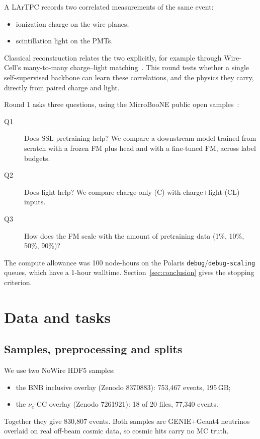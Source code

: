 \documentclass[11pt,a4paper]{article}
\newcommand{\nue}{\ensuremath{\nu_e}}
\newcommand{\code}[1]{\texttt{\small #1}}
\begin{document}
A LArTPC records two correlated measurements of the same event:
\begin{itemize}
  \item ionization charge on the wire planes;
  \item scintillation light on the PMTs.
\end{itemize}
Classical reconstruction relates the two explicitly, for example through Wire-Cell's many-to-many charge--light matching~\cite{wcqlmatch,wcgeneric}. This round tests whether a single self-supervised backbone can learn these correlations, and the physics they carry, directly from paired charge and light.

Round 1 asks three questions, using the MicroBooNE public open samples~\cite{ubopendata}:
\begin{description}
  \item[Q1] Does SSL pretraining help? We compare a downstream model trained from scratch with a frozen FM plus head and with a fine-tuned FM, across label budgets.
  \item[Q2] Does light help? We compare charge-only (C) with charge+light (CL) inputs.
  \item[Q3] How does the FM scale with the amount of pretraining data (1\%, 10\%, 50\%, 90\%)?
\end{description}

The compute allowance was 100 node-hours on the Polaris \code{debug}/\code{debug-scaling} queues, which have a 1-hour walltime. Section~\ref{sec:conclusion} gives the stopping criterion.

\section{Data and tasks}
\subsection{Samples, preprocessing and splits}
We use two NoWire HDF5 samples:
\begin{itemize}
  \item the BNB inclusive overlay (Zenodo 8370883): 753{,}467 events, 195\,GB;
  \item the \nue-CC overlay (Zenodo 7261921): 18 of 20 files, 77{,}340 events.
\end{itemize}
Together they give 830{,}807 events. Both samples are GENIE+Geant4 neutrinos overlaid on real off-beam cosmic data, so cosmic hits carry no MC truth.
\end{document}
